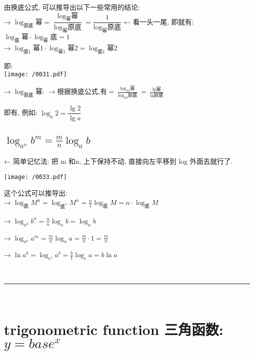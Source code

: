 \documentclass[UTF8]{ctexart}
\begin{document}
由换底公式, 可以推导出以下一些常用的结论: \\

→  $\log _{\text{原底}}\text{幂}=\dfrac{\log _{\text{幂}}\text{幂}}{\log _{\text{幂}}\text{原底}}=\dfrac{1}{\log _{\text{幂}}\text{原底}}$ 
← 看一头一尾, 即就有: $\boxed{\log _{\text{底}}\text{幂}\cdot \log _{\text{幂}}\text{底}=1}$
\\

→ $ \boxed{\log _{\text{底}1}\text{幂}1\cdot \log _{\text{幂}1}\text{幂}2=\log _{\text{底}1}\text{幂}2 }$

即: \\
\texttt{[image: /0031.pdf]}



→ $ \boxed{\log _{\text{原底}}\text{幂:\ }\rightarrow \text{根据换底公式,有}=\frac{\log _{10}\text{幂}}{\log _{10}\text{原底}}=\frac{\lg\text{幂}}{\lg\text{原底}}
}$

即有, 例如: $\log _a2=\dfrac{\lg 2}{\lg a} $



\dotfill



\subsection{$\log _{a^n}b^m=\frac{m}{n}\log _ab $}

← 简单记忆法: 把 m 和n, 上下保持不动, 直接向左平移到 log 外面去就行了. \\

\begin{myEnvSample}
\texttt{[image: /0033.pdf]}
\end{myEnvSample}



这个公式可以推导出: \\


→ $\log _{\text{底}}M^n=\log _{\text{底}^1}M^n=\frac{n}{1}\log _{\text{底}}M=n\cdot \log _{\text{底}}M $

→ $ \log _{a^n}b^n=\frac{n}{n}\log _ab=\log _ab$

→ $\log _{a^n}a^m=\frac{m}{n}\log _aa=\frac{m}{n}\cdot 1=\frac{m}{n} $


→ $\ln a^b=\log _{e^1}a^b=\frac{b}{1}\log _ea=b\ln a $



~\\
\hrule
~\\


\section{trigonometric function 三角函数:  $ y=base^x $}
\end{document}

